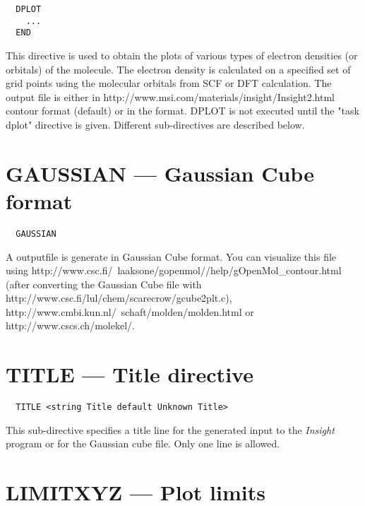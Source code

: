 %
%
\label{sec:dplot}
\begin{verbatim}
  DPLOT
    ...
  END
\end{verbatim}

This directive is used to obtain the plots of various types of electron
densities (or orbitals) of the molecule. The electron density is calculated
on a specified set of grid points using the molecular orbitals
from SCF or DFT calculation. The output file is either in 
{http://www.msi.com/materials/insight/Insight2.html} contour format
(default)
 or in the 
format.  DPLOT is not executed until the "task dplot" directive is given.  
Different sub-directives are described below.

\section{GAUSSIAN --- Gaussian Cube format}

\begin{verbatim}
  GAUSSIAN
\end{verbatim}

A outputfile is generate in Gaussian Cube format.
You can visualize this file using  
{http://www.csc.fi/~laaksone/gopenmol//help/gOpenMol_contour.html}
(after converting the Gaussian Cube file with 
{http://www.csc.fi/lul/chem/scarecrow/gcube2plt.c}),
{http://www.cmbi.kun.nl/~schaft/molden/molden.html} 
 or 
{http://www.cscs.ch/molekel/}.

\section{TITLE --- Title directive}

\begin{verbatim}
  TITLE <string Title default Unknown Title>
\end{verbatim}

This sub-directive specifies a title line for the generated
input to the {\em Insight} program or for the Gaussian cube
file. Only one line is allowed.

\section{LIMITXYZ --- Plot limits}

